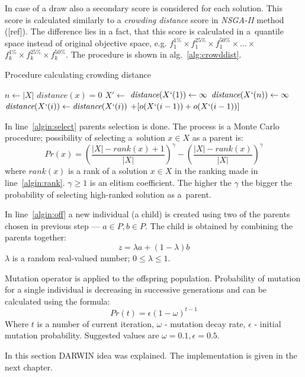 In case of a draw also a secondary score is considered for each solution. This
score is calculated similarly to a \textit{crowding distance} score in
\textit{NSGA-II} method ([ref]). The difference lies in a fact, that this
score is calculated in a~quantile space instead of original objective space,
e.g. $f^{1\%}_1 \times f^{25\%}_1 \times f^{50\%}_1 \times \dots \times $
$f^{1\%}_k \times f^{25\%}_k \times f^{50\%}_k$. The procedure is shown in
alg.~\ref{alg:crowddist}.

\begin{algorithm}
  \caption{Procedure calculating crowding distance}\label{alg:crowddist}
  \begin{algorithmic}[1]
    \State $n \gets |X|$ 
     
    \State $\textit{distance}(x) = 0$
    \EndFor
    \State $X' \gets$  
    \State $\textit{distance}(X`(1)) \gets \infty$ 
    \State $\textit{distance}(X`(n)) \gets \infty$ 
    \EndFor
     
    \State $\textit{distance}(X`(i)) \gets \textit{distance}(X`(i))$
    $+ [o(X`(i-1)) + o(X`(i-1))]$
    \EndFor
    \EndProcedure{}
  \end{algorithmic}
\end{algorithm}

In line~\ref{algin:select} parents selection is done. The process is a Monte
Carlo procedure; possibility of selecting a~solution $x \in X$ as a parent
is:\\
$$Pr(x) = \left( \frac{|X|-\textit{rank}(x) + 1}{|X|} \right)^\gamma - \left( \frac{|X|-\textit{rank}(x)}{|X|} \right)^\gamma$$
where $\textit{rank}(x)$ is a rank of a solution $x \in X$ in the ranking made
in line~\ref{algin:rank}. $\gamma \geq 1$ is an elitism coefficient. The higher
the $\gamma$ the bigger the probability of selecting high-ranked solution as
a~parent.

In line~\ref{algin:off} a new individual (a child) is created using two of the
parents chosen in previous step --- $a \in P, b \in P$. The child is obtained
by combining the parents together: $$z = \lambda a + (1 - \lambda) b$$
$\lambda$ is a random real-valued number; $0 \leq \lambda \leq 1$.


Mutation operator is applied to the offspring population. Probability of
mutation for a single individual is decreasing in successive generations and
can be calculated using the formula: $$Pr(t) = \epsilon (1 - \omega)^{t-1}$$
Where $t$ is a number of current iteration, $\omega$ - mutation decay rate,
$\epsilon$ - initial mutation probability. Suggested values are
$\omega = 0.1, \epsilon = 0.5$.

In this section DARWIN idea was explained. The implementation is given in the
next chapter.

